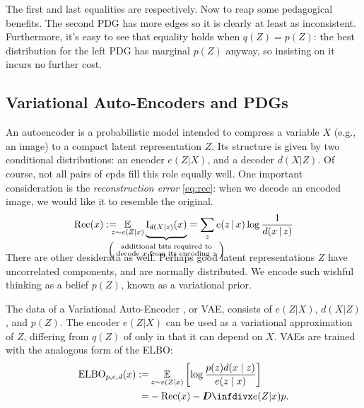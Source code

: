 The first and last equalities are  respectively.
Now to reap some pedagogical benefits.
The second PDG has more edges so it is clearly at least as inconsistent. Furthermore, it's easy to see that equality holds when $q(Z) \!=\! p(Z)$: the best distribution for the left PDG has marginal $p(Z)$ anyway, so insisting on it incurs no further cost.




\subsection{Variational Auto-Encoders and PDGs}

An autoencoder is a probabilistic model intended to compress a
variable $X$ (e.g., an image) to a compact latent representation
$Z$.
Its structure is given by two conditional distributions:
an encoder $e(Z | X)$, and a decoder $d(X | Z)$.
Of course, not all pairs of cpds fill this role equally well.
One important consideration is the
\emph{reconstruction error} \eqref{eq:rec}: when we decode an encoded image, we would like it to resemble the original.
\begin{equation}
	\mathrm{Rec}(x) := \!\!\!\!\! \Ex_{z \sim e(Z|x)} \smash{\underbrace{\mathrm I_{d(X |z)}(x)\vphantom{\Big|}}_{\mathclap{\left(\;\substack{\text{additional bits required to}\\\text{decode $x$ from its encoding  $z$}}\;\right)}}}
	= \sum_z e(z \,|\, x) \log \frac1{d(x \,|\, z)}\label{eq:rec}
\end{equation}
\medskip

There are other desiderata as well. Perhaps good latent representations $Z$ have uncorrelated components, and are normally distributed.
We encode such wishful thinking as a belief $p(Z)$, known as a variational prior.

The data of a Variational Auto-Encoder
\parencite{kingma2013autoencoding,rezende2014stochastic}, or VAE,
consists of $e(Z|X)$, $d(X|Z)$, and $p(Z)$.
The encoder $e(Z|X)$ can be used as a variational approximation of $Z$, differing from $q(Z)$ of  only in that it can depend on $X$.
VAEs are trained with the analogous form of the ELBO:
\begin{align*}
	\mathrm{ELBO}_{p,e,d}(x) :=&
		\Ex_{z \sim e(Z|x)} \left[\log \frac{p(z) d(x\mid z)}{e(z\mid x)} \right] \\
		=& - \mathrm{Rec}(x) - \kldiv{e(Z|x)}{p}.
\end{align*}

